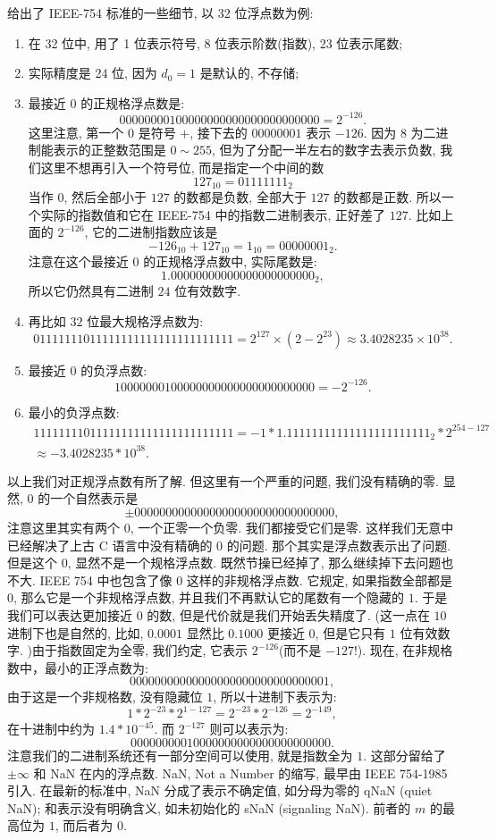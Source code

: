 \documentclass[a4paper]{ctexart}
\begin{document}
{ 给出了 IEEE-754 标准的一些细节, 以 32 位浮点数为例:
\begin{enumerate}
\item 在 32 位中, 用了 1 位表示符号, 8 位表示阶数(指数), 23 位表示尾数;
\item 实际精度是 24 位, 因为 $d_0 = 1$ 是默认的, 不存储;
\item 最接近 $0$ 的正规格浮点数是:
$$
0 00000001 00000000000000000000000 = 2^{-126}.
$$
这里注意, 第一个 $0$ 是符号 $+$, 接下去的 $00000001$ 表示 $-126$. 因为 $8$ 
为二进制能表示的正整数范围是 $0 \sim 255$, 但为了分配一半左右的数字去表示负数, 
我们这里不想再引入一个符号位, 而是指定一个中间的数 
$$
127_{10} = 01111111_{2}
$$
当作 $0$, 然后全部小于 $127$ 的数都是负数, 全部大于 $127$ 的数都是正数. 
所以一个实际的指数值和它在 IEEE-754 中的指数二进制表示, 正好差了 $127$. 
比如上面的 $2^{-126}$, 它的二进制指数应该是 
$$
-126_{10} + 127_{10} = 1_{10} = 00000001_{2}.
$$ 
注意在这个最接近 $0$ 的正规格浮点数中, 实际尾数是:
$$
1.00000000000000000000000_{2},
$$
所以它仍然具有二进制 $24$ 位有效数字.
\item 再比如 $32$ 位最大规格浮点数为:
$$
0 11111110 11111111111111111111111 = 2^{127} \times (2 - 2^{23}) \approx 
3.4028235 \times 10^{38}.
$$
\item 最接近 $0$ 的负浮点数:
$$
1 00000001 00000000000000000000000 = -2^{-126}.  
$$
\item 最小的负浮点数:
$$
\begin{array}{l}
1 11111110 11111111111111111111111 
= -1 * 1.11111111111111111111111_{2} * 2^{254-127} \\
\approx -3.4028235 * 10^{38}.
\end{array}
$$
\end{enumerate}
以上我们对正规浮点数有所了解. 但这里有一个严重的问题, 我们没有精确的零. 显然, $0$ 
的一个自然表示是
$$
\pm 0 00000000 00000000000000000000000,
$$
注意这里其实有两个 $0$, 一个正零一个负零. 我们都接受它们是零. 
这样我们无意中已经解决了上古 C 语言中没有精确的 $0$ 的问题. 那个其实是浮点数表示出了问题.
但是这个 $0$, 显然不是一个规格浮点数. 既然节操已经掉了, 那么继续掉下去问题也不大. 
IEEE 754 中也包含了像 $0$ 这样的非规格浮点数. 它规定, 如果指数全部都是 $0$, 
那么它是一个非规格浮点数, 并且我们不再默认它的尾数有一个隐藏的 $1$. 
于是我们可以表达更加接近 $0$ 的数, 但是代价就是我们开始丢失精度了. (这一点在 $10$ 
进制下也是自然的, 比如, $0.0001$ 显然比 $0.1000$ 更接近 $0$, 但是它只有 $1$ 
位有效数字. )由于指数固定为全零, 我们约定, 它表示 $2^{-126}$(而不是 $-127$!). 
现在, 在非规格数中，最小的正浮点数为:
$$
0 00000000 00000000000000000000001,
$$
由于这是一个非规格数, 没有隐藏位 $1$, 
所以十进制下表示为:
$$
1 * 2^{-23} * 2^{1-127} = 2^{-23} * 2^{-126} = 2^{-149},
$$
在十进制中约为 $1.4 * 10^{-45}$.
而 $2^{-127}$ 则可以表示为:
$$
0 00000000 10000000000000000000000.
$$ 
注意我们的二进制系统还有一部分空间可以使用, 就是指数全为 $1$.
这部分留给了$\pm \infty$ 和 NaN 在内的浮点数.
NaN, Not a Number 的缩写, 最早由 IEEE 754-1985 引入. 在最新的标准中,
NaN 分成了表示不确定值, 如分母为零的 qNaN (quiet NaN); 和表示没有明确含义,
如未初始化的 sNaN (signaling NaN). 前者的 $m$ 的最高位为 $1$,
而后者为 $0$.

}
\end{document}

